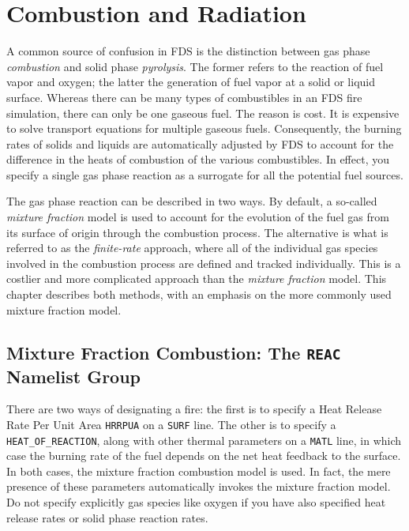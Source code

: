 \documentclass[11pt]{book}
\newcommand{\ct}{\tt\small}
\begin{document}
\chapter{Combustion and Radiation}
\label{chap:combustion}

A common source of confusion in FDS is the distinction between gas phase {\em combustion} and solid phase {\em pyrolysis}. The former
refers to the reaction of fuel vapor and oxygen; the latter the generation of fuel vapor at a solid or liquid surface. Whereas there
can be many types of combustibles in an FDS fire simulation, there can only be one gaseous fuel. The reason is cost. It is expensive to
solve transport equations for multiple gaseous fuels. Consequently, the burning rates of solids and liquids are automatically adjusted by
FDS to account for the difference in the heats of combustion of the various combustibles. In effect, you specify a single gas phase
reaction as a surrogate for all the potential fuel sources.

The gas phase reaction can be described in two ways. By default, a so-called {\em mixture fraction} model is used to account for the evolution of
the fuel gas from its surface of origin through the combustion process. The alternative is what is referred to as the {\em finite-rate}
approach, where all of the individual gas species involved in the combustion process are defined and tracked individually. This is a
costlier and more complicated approach than the {\em mixture fraction} model. This chapter describes both methods, with an emphasis on the more
commonly used mixture fraction model.


\section{Mixture Fraction Combustion: The \texorpdfstring{{\tt REAC}}{REAC} Namelist Group}
\label{info:REAC}


There are two ways of designating a fire: the first is to specify a
Heat Release Rate Per Unit Area {\ct HRRPUA} on a
{\ct SURF} line. The other is to specify a
{\ct HEAT\_OF\_REACTION}, along with other thermal parameters on a {\ct MATL} line,
in which case the burning rate of the fuel depends on the net heat feedback to the surface.
In both cases, the mixture fraction combustion model is used. In fact, the mere presence of these
parameters automatically invokes the mixture fraction model. Do not specify explicitly gas species like
oxygen if you have also specified heat release rates or solid phase reaction rates.
\end{document}
